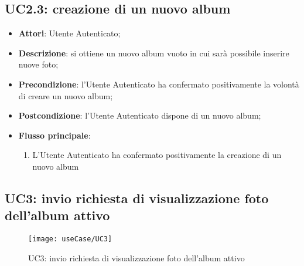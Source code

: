 
\subsection{UC2.3: creazione di un nuovo album}
\label{uc:uc2.3}
\hypertarget{UC2.3}{}

\begin{itemize}
  \item \textbf{Attori}: Utente Autenticato;
  \item \textbf{Descrizione}: si ottiene un nuovo album vuoto in cui sarà
possibile inserire nuove foto;
  \item \textbf{Precondizione}: l'Utente Autenticato ha confermato
positivamente la volontà di creare un nuovo album;
  \item \textbf{Postcondizione}: l'Utente Autenticato dispone di un nuovo album;
  \item \textbf{Flusso principale}:
  \begin{enumerate}
    \item L'Utente Autenticato ha confermato positivamente la creazione di un
nuovo album
  \end{enumerate}
\end{itemize}



\newpage

\subsection{UC3: invio richiesta di visualizzazione foto dell'album attivo}
\label{uc:uc3}
\hypertarget{UC3}{}

\begin{figure}[H]
  \centering
  \texttt{[image: useCase/UC3]}
  \caption{UC3: invio richiesta di visualizzazione foto dell'album attivo}
\end{figure}

